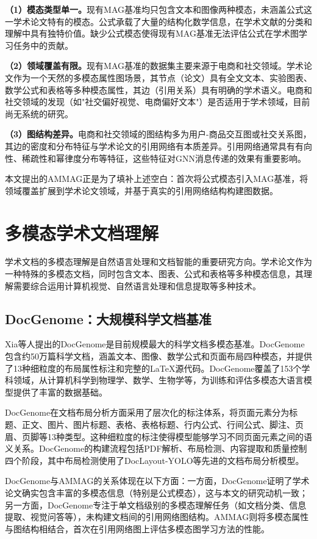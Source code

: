 \textbf{（1）模态类型单一。}现有MAG基准均只包含文本和图像两种模态，未涵盖公式这一学术论文特有的模态。公式承载了大量的结构化数学信息，在学术文献的分类和理解中具有独特价值。缺少公式模态使得现有MAG基准无法评估公式在学术图学习任务中的贡献。

\textbf{（2）领域覆盖有限。}现有MAG基准的数据集主要来源于电商和社交领域。学术论文作为一个天然的多模态属性图场景，其节点（论文）具有全文文本、实验图表、数学公式和表格等多种模态属性，其边（引用关系）具有明确的学术语义。电商和社交领域的发现（如"社交偏好视觉、电商偏好文本"）是否适用于学术领域，目前尚无系统的研究。

\textbf{（3）图结构差异。}电商和社交领域的图结构多为用户-商品交互图或社交关系图，其边的密度和分布特征与学术论文的引用网络有本质差异。引用网络通常具有有向性、稀疏性和幂律度分布等特征，这些特征对GNN消息传递的效果有重要影响。

本文提出的AMMAG正是为了填补上述空白：首次将公式模态引入MAG基准，将领域覆盖扩展到学术论文领域，并基于真实的引用网络结构构建图数据。

\section{多模态学术文档理解}

学术文档的多模态理解是自然语言处理和文档智能的重要研究方向。学术论文作为一种特殊的多模态文档，同时包含文本、图表、公式和表格等多种模态信息，其理解需要综合运用计算机视觉、自然语言处理和信息提取等多种技术。

\subsection{DocGenome：大规模科学文档基准}

Xia等人\cite{xia2024docgenome}提出的DocGenome是目前规模最大的科学文档多模态基准。DocGenome包含约50万篇科学文档，涵盖文本、图像、数学公式和页面布局四种模态，并提供了13种细粒度的布局属性标注和完整的LaTeX源代码。DocGenome覆盖了153个学科领域，从计算机科学到物理学、数学、生物学等，为训练和评估多模态大语言模型提供了丰富的数据基础。

DocGenome在文档布局分析方面采用了层次化的标注体系，将页面元素分为标题、正文、图片、图片标题、表格、表格标题、行内公式、行间公式、脚注、页眉、页脚等13种类型。这种细粒度的标注使得模型能够学习不同页面元素之间的语义关系。DocGenome的构建流程包括PDF解析、布局检测、内容提取和质量控制四个阶段，其中布局检测使用了DocLayout-YOLO等先进的文档布局分析模型。

DocGenome与AMMAG的关系体现在以下方面：一方面，DocGenome证明了学术论文确实包含丰富的多模态信息（特别是公式模态），这与本文的研究动机一致；另一方面，DocGenome专注于单文档级别的多模态理解任务（如文档分类、信息提取、视觉问答等），未构建文档间的引用网络图结构。AMMAG则将多模态属性与图结构相结合，首次在引用网络图上评估多模态图学习方法的性能。

